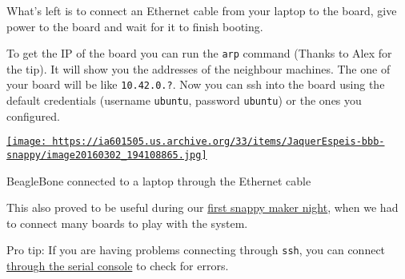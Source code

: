 \documentclass[12pt]{article}
\begin{document}
What's left is to connect an Ethernet cable from your laptop to the board,
give power to the board and wait for it to finish booting.

To get the IP of the board you can run the \verb$arp$ command (Thanks to
Alex for the tip). It will show you the addresses of the neighbour machines.
The one of your board will be like \verb$10.42.0.?$. Now you can ssh into the
board using the default credentials (username \verb$ubuntu$, password
\verb$ubuntu$) or the ones you configured.

\begin{center}
  \href{
    https://ia601505.us.archive.org/33/items/JaquerEspeis-bbb-snappy/image20160302_194108865.jpg}{
    \texttt{[image: 
      https://ia601505.us.archive.org/33/items/JaquerEspeis-bbb-snappy/image20160302\_194108865.jpg]}
  }
  \caption{BeagleBone connected to a laptop through the Ethernet cable}
\end{center}

This also proved to be useful during our
\href{https://archive.org/details/JaquerEspeis-bbb-snappy}{first snappy maker
night}, when we had to connect many boards to play with the system.

Pro tip: If you are having problems connecting through \verb$ssh$, you can
connect
\href{http://elopio.net/blog/connecting-to-snappy-through-the-serial-console/}
{through the serial console} to check for errors.
\end{document}
